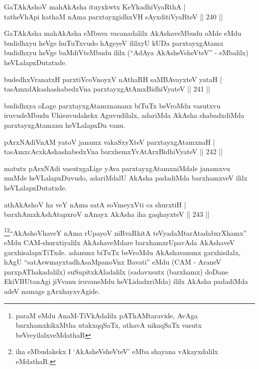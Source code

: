 \begin{shl}
GaTAkAshoV mahAkAsha ituyxkwtx KeYkadhiVyaRthA |\\
tatheVhApi kathaM nAma parxtayxgidhxVH sAyxditiVyaRteV \hfill || 240 ||
\end{shl}

\begin{artha}
GaTAkAsha mahAkAsha eMbuva vacanadalilx AkAshaveMbudu oMde eMdu budidhxyu heVge huTuTxvudo hAgeyeV ililxyU kUDa parxtayxgAtamx budidhxyu heVge baMdiVteMbudu ililx (``AdAya AkAsheVsheVteV'' - eMbalilx) heVLalapxDutatxde.
\end{artha}

\begin{shl}
budedhxVranatxH parxtiVcoV\s noyxV nAthaRH saMBAvayxteV yataH |\\
tasAmxdAkashashabedxVna parxtayxgAtAmx\s BidhiVyateV \hfill || 241 ||
\end{shl}

\begin{artha}
budidhxya oLage parxtayxgAtamxnananx biTuTx beVroMdu vasutxvu iruvudeMbudu \-Uhisuvudakekx Aguvudilalx, adariMda AkAsha shabadxdiMda parxtayxgAtamxnu heVLalapxDu\-	vanu.
\end{artha}

\begin{shl}
pArxNAdiVnAM yatoV janamx vakaSxyXteV parxtayxgAtamxnaH |\\
tasAmxcAcx\s \s kAshashabedxVna barxhemxYvAtArxBidhiVyateV \hfill || 242 ||
\end{shl}

\begin{artha}
matutx pArxNAdi vasutxgaLige yAva parxtayxgAtamxniMdale janamxvu muMde heVLalapxDuvudo, adariMdalU AkAsha padadiMda barxhamxveV ililx heVLalapxDutatxde.
\end{artha}


\begin{shl}
athA\s \s kAshoV ha veY nAma satA soVmeyxVti ca shurxtiH |\\
barxhAmxkAshAtapxroV nAnayx AkAsha iha gaqhayxteV \hfill || 243 ||
\end{shl}

\begin{artha}
\footnote{paraM eMdu AnaM-TiVkAdalilx pAThAMtaravide, AvAga  barxhamxkikxMtha utakxqqSaTx, athavA nikaqSaTx vasutx  beVreyilalxveMdathaR}\footnote{iha eMbudakekx I `AkAsheVsheVteV' eMba  shayana vAkayxdalilx eMdathaR.}``AkAshoVhaveY nAma rUpayoV niRvaRhitA teVyadaMta\-rAtadabxrXhamx'' eMdu CAM-shurxtiyalilx  AkAshaveMdare barxhamxrUpavAda AkAshaveV garxhisalapxTiTxde. \-adanunx biTuTx beVroMdu AkAshavanunx garxhisilalx, hAgU ``satAswmayxtadhA\-saMpanoVnx Bavati'' eMdu (CAM - AraneV parxpAThakadalilx) suSupitxkAladalilx (sadavxsutx (barxhamx) doDane EkiVBUtanAgi jiVvanu iruvaneMdu heVLidadxriMda) ililx AkAsha padadiMda adeV namage gArxhayxvAgide.
\end{artha}

